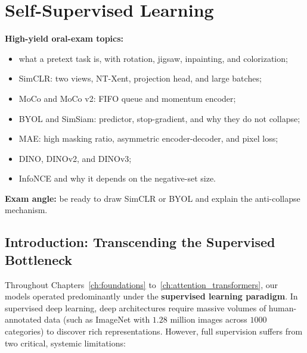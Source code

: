 \newpage

\chapter{Self-Supervised Learning}\label{ch:self_supervised_learning}

\begin{ExamFocusBox}
\textbf{High-yield oral-exam topics:}
\begin{itemize}[nosep, leftmargin=*]
    \item what a pretext task is, with rotation, jigsaw, inpainting, and colorization;
    \item SimCLR: two views, NT-Xent, projection head, and large batches;
    \item MoCo and MoCo v2: FIFO queue and momentum encoder;
    \item BYOL and SimSiam: predictor, stop-gradient, and why they do not collapse;
    \item MAE: high masking ratio, asymmetric encoder-decoder, and pixel loss;
    \item DINO, DINOv2, and DINOv3;
    \item InfoNCE and why it depends on the negative-set size.
\end{itemize}
\textbf{Exam angle:} be ready to draw SimCLR or BYOL and explain the anti-collapse mechanism.
\end{ExamFocusBox}


\section{Introduction: Transcending the Supervised Bottleneck}

Throughout Chapters~\ref{ch:foundations} to~\ref{ch:attention_transformers}, our models operated predominantly under the \textbf{supervised learning paradigm}. In supervised deep learning, deep architectures require massive volumes of human-annotated data (such as ImageNet with $1.28$ million images across $1000$ categories) to discover rich representations. However, full supervision suffers from two critical, systemic limitations:

